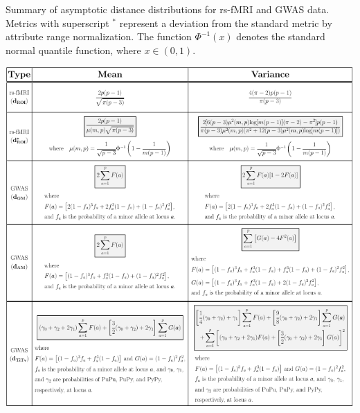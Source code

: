 \documentclass[10pt,letterpaper]{article}\usepackage[]{graphicx}\usepackage[]{color}
\begin{document}
\begin{table}[H]
\caption{Summary of asymptotic distance distributions for rs-fMRI and GWAS data. Metrics with superscript $^*$ represent a deviation from the standard metric by attribute range normalization. The function $\Phi^{-1}(x)$ denotes the standard normal quantile function, where $x \in (0,1)$.}
\label{tab:dist_distr_bio}
\centering
\includegraphics[width=\textwidth]{bioinformaticsy_tab.pdf}
\end{table}
\end{document}
